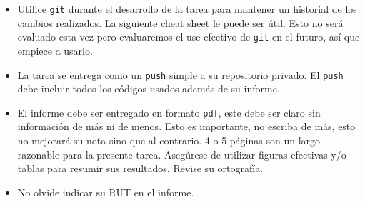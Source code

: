\documentclass[letter, 11pt]{article}
\begin{document}
\vspace{1em}
\begin{itemize}

  \item Utilice \texttt{git} durante el desarrollo de la tarea para mantener un
    historial de los cambios realizados. La siguiente
    \href{https://education.github.com/git-cheat-sheet-education.pdf}{cheat
    sheet} le puede ser útil. Esto no será evaluado esta vez pero evaluaremos
    el use efectivo de \texttt{git} en el futuro, así que empiece a usarlo.

  \item La tarea se entrega como un \texttt{push} simple a su repositorio
    privado. El \texttt{push} debe incluir todos los códigos usados además de
    su informe.

  \item El informe debe ser entregado en formato \texttt{pdf}, este debe ser
    claro sin información de más ni de menos. Esto es importante, no escriba de
    más, esto no mejorará su nota sino que al contrario. 4 o 5 páginas son un
    largo razonable para la presente tarea.  Asegúrese de utilizar figuras
    efectivas y/o tablas para resumir sus resultados. Revise su ortografía.

  \item No olvide indicar su RUT en el informe.

\end{itemize}
\end{document}
